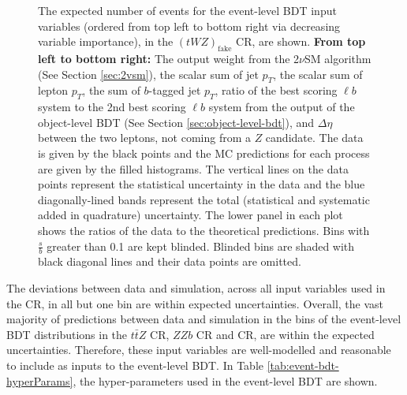 \begin{figure}[htbp]
\caption{The expected number of events for the event-level BDT input variables (ordered from top left to bottom right via decreasing variable importance), in the $(tWZ)_{\text{fake}}$ CR, are shown. \textbf{From top left to bottom right:} The output weight from the 2$\nu$SM algorithm (See Section \ref{sec:2vsm}), the scalar sum of jet $p_{T}$, the scalar sum of lepton $p_{T}$, the sum of $b$-tagged jet $p_{T}$, ratio of the best scoring $\ell b$ system to the 2nd best scoring $\ell b$ system from the output of the object-level BDT (See Section \ref{sec:object-level-bdt}), and $\Delta \eta$ between the two leptons, not coming from a $Z$ candidate. The data is given by the black points and the MC predictions for each process are given by the filled histograms. The vertical lines on the data points represent the statistical uncertainty in the data and the blue diagonally-lined bands represent the total (statistical and systematic added in quadrature) uncertainty. The lower panel in each plot shows the ratios of the data to the theoretical predictions. Bins with $\frac{s}{b}$ greater than 0.1 are kept blinded. Blinded bins are shaded with black diagonal lines and their data points are omitted.}
  \label{fig:4lep-tWZfakeCR-eventbdt-vars}
\end{figure}The deviations between data and simulation, across all input variables used in the \tWZfake CR, in all but one bin are within expected uncertainties. Overall, the vast majority of predictions between data and simulation in the bins of the event-level BDT distributions in the $t\bar{t}Z$ CR, $ZZb$ CR and \tWZfake CR, are within the expected uncertainties. Therefore, these input variables are well-modelled and reasonable to include as inputs to the event-level BDT. In Table \ref{tab:event-bdt-hyperParams}, the hyper-parameters used in the event-level BDT are shown.
